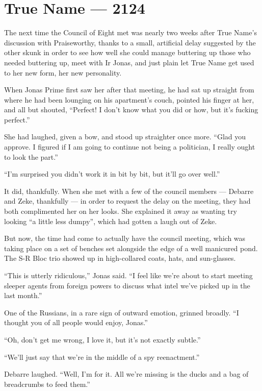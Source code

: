 \hypertarget{true-name-2124}{%
\chapter{True Name — 2124}\label{true-name-2124}}

The next time the Council of Eight met was nearly two weeks after True Name's discussion with Praiseworthy, thanks to a small, artificial delay suggested by the other skunk in order to see how well she could manage buttering up those who needed buttering up, meet with Ir Jonas, and just plain let True Name get used to her new form, her new personality.

When Jonas Prime first saw her after that meeting, he had sat up straight from where he had been lounging on his apartment's couch, pointed his finger at her, and all but shouted, ``Perfect! I don't know what you did or how, but it's fucking perfect.''

She had laughed, given a bow, and stood up straighter once more. ``Glad you approve. I figured if I am going to continue not being a politician, I really ought to look the part.''

``I'm surprised you didn't work it in bit by bit, but it'll go over well.''

It did, thankfully. When she met with a few of the council members — Debarre and Zeke, thankfully — in order to request the delay on the meeting, they had both complimented her on her looks. She explained it away as wanting try looking ``a little less dumpy'', which had gotten a laugh out of Zeke.

But now, the time had come to actually have the council meeting, which was taking place on a set of benches set alongside the edge of a well manicured pond. The S-R Bloc trio showed up in high-collared coats, hats, and sun-glasses.

``This is utterly ridiculous,'' Jonas said. ``I feel like we're about to start meeting sleeper agents from foreign powers to discuss what intel we've picked up in the last month.''

One of the Russians, in a rare sign of outward emotion, grinned broadly. ``I thought you of all people would enjoy, Jonas.''

``Oh, don't get me wrong, I love it, but it's not exactly subtle.''

``We'll just say that we're in the middle of a spy reenactment.''

Debarre laughed. ``Well, I'm for it. All we're missing is the ducks and a bag of breadcrumbs to feed them.''

